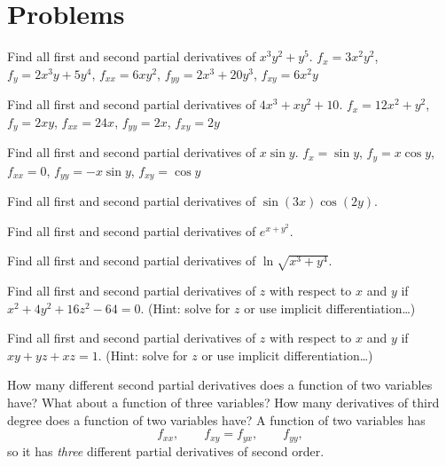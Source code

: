 \section{Problems}
\label{sec:partial-deriv-problems}
\begin{multicols}{2}
\problemfont 
\problem Find all first and second partial derivatives of $x^3y^2+y^5$.  
\answer $f_x=3x^2y^2$, $f_y=2x^3y+5y^4$, $f_{xx}=6xy^2$,
$f_{yy}=2x^3+20y^3$, $f_{xy}=6x^2y$
\endanswer

\problem Find all first and second partial derivatives of $4x^3+xy^2+10$.  
\answer
$f_x=12x^2+y^2$, $f_y=2xy$, $f_{xx}=24x$, $f_{yy}=2x$, $f_{xy}=2y$
\endanswer

\problem Find all first and second partial derivatives of $x\sin y$.  
\answer $f_x=\sin y$, $f_y=x\cos y$, $f_{xx}=0$, $f_{yy}=-x\sin y$,
$f_{xy}=\cos y$
\endanswer

\problem Find all first and second partial derivatives of  
$\sin(3x)\cos(2y)$.

\problem Find all first and second partial derivatives of $e^{x+y^2}$.  

\problem Find all first and second partial derivatives of  
$\ln\sqrt{x^3+y^4}$.

\problem Find all first and second partial derivatives of $z$ with respect  
to $x$ and $y$ if $x^2+4y^2+16z^2-64=0$.  (Hint: solve for $z$ or use implicit
differentiation\ldots)

\problem Find all first and second partial derivatives of $z$ with respect  
to $x$ and $y$ if $xy+yz+xz=1$. (Hint: solve for $z$ or use implicit
differentiation\ldots)

\problem How many different second partial derivatives does a function of  
two variables have?  What about a function of three variables?  How many
derivatives of third degree does a function of two variables have?
\answer
A function of two variables has
\[
  f_{xx},\qquad f_{xy}=f_{yx},\qquad f_{yy},
\]
so it has \emph{three} different partial derivatives of second order.


\end{multicols}
